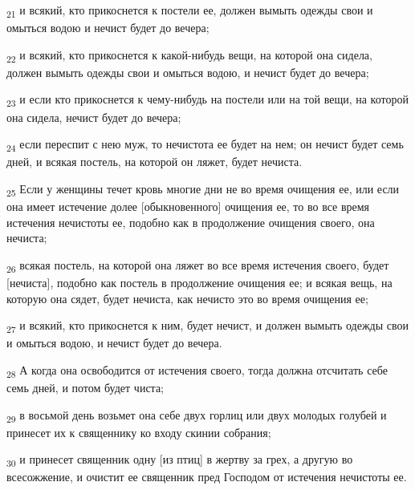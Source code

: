 \begin{tcolorbox}
\textsubscript{21} и всякий, кто прикоснется к постели ее, должен вымыть одежды свои и омыться водою и нечист будет до вечера;
\end{tcolorbox}
\begin{tcolorbox}
\textsubscript{22} и всякий, кто прикоснется к какой-нибудь вещи, на которой она сидела, должен вымыть одежды свои и омыться водою, и нечист будет до вечера;
\end{tcolorbox}
\begin{tcolorbox}
\textsubscript{23} и если кто прикоснется к чему-нибудь на постели или на той вещи, на которой она сидела, нечист будет до вечера;
\end{tcolorbox}
\begin{tcolorbox}
\textsubscript{24} если переспит с нею муж, то нечистота ее будет на нем; он нечист будет семь дней, и всякая постель, на которой он ляжет, будет нечиста.
\end{tcolorbox}
\begin{tcolorbox}
\textsubscript{25} Если у женщины течет кровь многие дни не во время очищения ее, или если она имеет истечение долее [обыкновенного] очищения ее, то во все время истечения нечистоты ее, подобно как в продолжение очищения своего, она нечиста;
\end{tcolorbox}
\begin{tcolorbox}
\textsubscript{26} всякая постель, на которой она ляжет во все время истечения своего, будет [нечиста], подобно как постель в продолжение очищения ее; и всякая вещь, на которую она сядет, будет нечиста, как нечисто это во время очищения ее;
\end{tcolorbox}
\begin{tcolorbox}
\textsubscript{27} и всякий, кто прикоснется к ним, будет нечист, и должен вымыть одежды свои и омыться водою, и нечист будет до вечера.
\end{tcolorbox}
\begin{tcolorbox}
\textsubscript{28} А когда она освободится от истечения своего, тогда должна отсчитать себе семь дней, и потом будет чиста;
\end{tcolorbox}
\begin{tcolorbox}
\textsubscript{29} в восьмой день возьмет она себе двух горлиц или двух молодых голубей и принесет их к священнику ко входу скинии собрания;
\end{tcolorbox}
\begin{tcolorbox}
\textsubscript{30} и принесет священник одну [из птиц] в жертву за грех, а другую во всесожжение, и очистит ее священник пред Господом от истечения нечистоты ее.
\end{tcolorbox}
